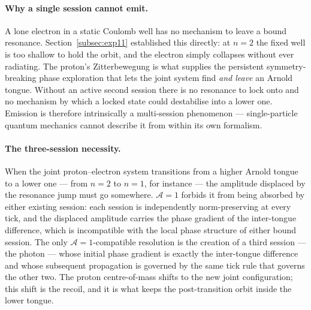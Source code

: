\paragraph{Why a single session cannot emit.}
A lone electron in a static Coulomb well has no mechanism to leave a
bound resonance.
Section~\ref{subsec:exp11} established this directly: at $n{=}2$ the
fixed well is too shallow to hold the orbit, and the electron simply
collapses without ever radiating.
The proton's Zitterbewegung is what supplies the persistent
symmetry-breaking phase exploration that lets the joint system find
\emph{and leave} an Arnold tongue.
Without an active second session there is no resonance to lock onto and
no mechanism by which a locked state could destabilise into a lower one.
Emission is therefore intrinsically a multi-session phenomenon ---
single-particle quantum mechanics cannot describe it from within its own
formalism.

\paragraph{The three-session necessity.}
When the joint proton--electron system transitions from a higher Arnold
tongue to a lower one --- from $n{=}2$ to $n{=}1$, for instance --- the
amplitude displaced by the resonance jump must go somewhere.
$\mathcal{A}=1$ forbids it from being absorbed by either existing
session: each session is independently norm-preserving at every tick,
and the displaced amplitude carries the phase gradient of the inter-tongue
difference, which is incompatible with the local phase structure of
either bound session.
The only $\mathcal{A}=1$-compatible resolution is the creation of a
third session --- the photon --- whose initial phase gradient is exactly
the inter-tongue difference and whose subsequent propagation is governed
by the same tick rule that governs the other two.
The proton centre-of-mass shifts to the new joint configuration; this
shift is the recoil, and it is what keeps the post-transition orbit
inside the lower tongue.

